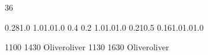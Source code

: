 \documentclass[10pt]{report}
\begin{document}
\thispagestyle{empty}
\begin{landscape}
\noindent{}

\setslotsize{4cm}{0.42cm}
 {36}
\settextframe{3mm}

\settimestyle{\small}

 {0.28}{1.0} {1.0}{1.0}{1.0}
 {0.4} {0.2} {1.0}{1.0}{1.0}
 {0.21}{0.5} {0.16}{1.0}{1.0}{1.0}

\begin{timetable}

   {1100} {1430} {Oliver}{}{}{oliver}
   {1130} {1630} {Oliver}{}{}{oliver}

\end{timetable}
\end{landscape}
\end{document}

